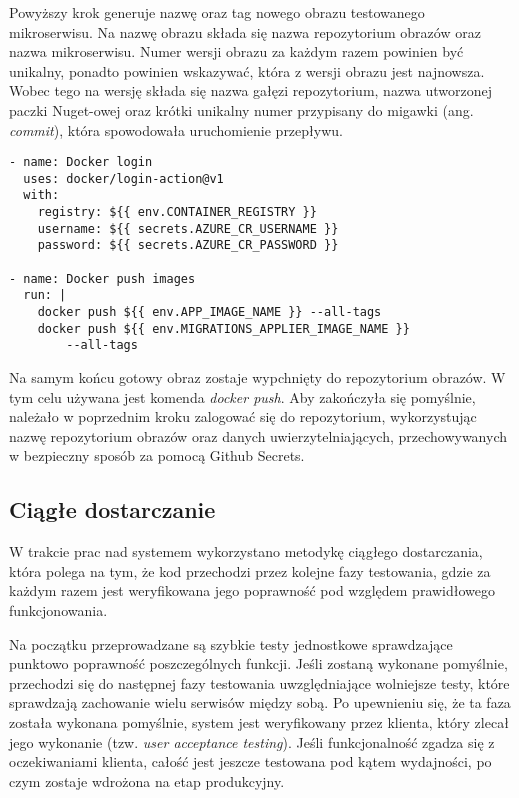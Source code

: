Powyższy krok generuje nazwę oraz tag nowego obrazu testowanego mikroserwisu. Na nazwę 
obrazu składa się nazwa repozytorium obrazów oraz nazwa mikroserwisu. Numer wersji 
obrazu za każdym razem powinien być unikalny, ponadto powinien wskazywać, która z 
wersji obrazu jest najnowsza. Wobec tego na wersję składa się nazwa gałęzi 
repozytorium, nazwa utworzonej paczki Nuget-owej oraz krótki unikalny numer przypisany 
do migawki (ang. \textit{commit}), która spowodowała uruchomienie przepływu.

\begin{lstlisting}
- name: Docker login
  uses: docker/login-action@v1
  with:
    registry: ${{ env.CONTAINER_REGISTRY }}
    username: ${{ secrets.AZURE_CR_USERNAME }}
    password: ${{ secrets.AZURE_CR_PASSWORD }}

- name: Docker push images
  run: |
    docker push ${{ env.APP_IMAGE_NAME }} --all-tags
    docker push ${{ env.MIGRATIONS_APPLIER_IMAGE_NAME }} 
        --all-tags
\end{lstlisting}

Na samym końcu gotowy obraz zostaje wypchnięty do repozytorium obrazów. W tym celu 
używana jest komenda \textit{docker push}. Aby zakończyła się pomyślnie, należało 
w poprzednim kroku zalogować się do repozytorium, wykorzystując nazwę repozytorium obrazów oraz 
danych uwierzytelniających, przechowywanych w bezpieczny sposób za pomocą Github 
Secrets.

\subsection{Ciągłe dostarczanie}

W trakcie prac nad systemem wykorzystano metodykę ciągłego dostarczania, która polega na tym, że kod 
przechodzi przez kolejne fazy testowania, gdzie za każdym razem jest weryfikowana jego poprawność pod 
względem prawidłowego funkcjonowania. 

Na początku przeprowadzane są szybkie testy jednostkowe sprawdzające punktowo poprawność 
poszczególnych funkcji. Jeśli zostaną wykonane pomyślnie, przechodzi się do następnej fazy 
testowania uwzględniające wolniejsze testy, które sprawdzają zachowanie wielu serwisów między 
sobą. Po upewnieniu się, że ta faza została wykonana pomyślnie, system jest weryfikowany przez 
klienta, który zlecał jego wykonanie (tzw. \textit{user acceptance testing}). Jeśli funkcjonalność zgadza się z 
oczekiwaniami klienta, całość jest jeszcze testowana pod kątem wydajności, po czym zostaje 
wdrożona na etap produkcyjny.

